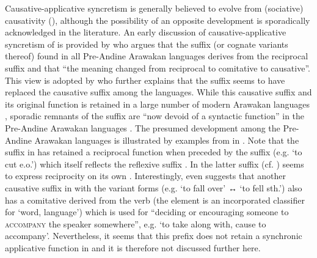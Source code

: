 Causative-applicative syncretism is generally believed to evolve from (sociative) causativity (), although the possibility of an opposite development is sporadically acknowledged in the literature. An early discussion of causative-applicative syncretism of  is provided by \citet[110]{wise:1990} who argues that the suffix  (or cognate variants thereof) found in all Pre-Andine Arawakan languages derives from the  reciprocal suffix  and that “the meaning changed from reciprocal to comitative to causative”. This view is adopted by \citet[501ff.]{payne:2002} who further explains that the suffix seems to have replaced the causative suffix  among the languages. While this causative suffix and its original function is retained in a large number of modern Arawakan languages \citep[103]{wise:1990}, sporadic remnants of the suffix are “now devoid of a syntactic function” in the Pre-Andine Arawakan languages \citep[501]{payne:2002}. The presumed development among the Pre-Andine Arawakan languages is illustrated by examples from  in  \citep[491f., 501]{payne:2002}. Note that the suffix  in  has retained a reciprocal function when preceded by the suffix  (e.g.  ‘to cut e.o.’) which itself reflects the  reflexive suffix  \citep[109f.]{wise:1990}. In  the latter suffix (cf. ) seems to express reciprocity on its own \citep[130]{mihas:2010}. Interestingly, \citet[488, 504]{payne:2002} even suggests that another causative suffix in  with the variant forms  (e.g.  ‘to fall over’ ↔  ‘to fell sth.’) also has a comitative  derived from the verb  (the  element is an incorporated classifier for ‘word, language’) which is used for “deciding or encouraging someone to \textsc{accompany} the speaker somewhere”, e.g.   ‘to take along with, cause to accompany’. Nevertheless, it seems that this prefix does not retain a synchronic applicative function in  and it is therefore not discussed further here. 

